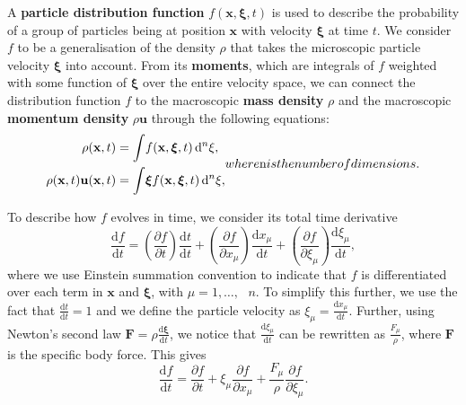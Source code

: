 \documentclass[a4paper, 11pt]{report}
\begin{document}
A \textbf{particle distribution function} $f(\mathbf{x},\bm{\xi},t)$ is used to describe the probability of a group of particles being at position $\mathbf{x}$ with velocity $\bm{\xi}$ at time $t$. We consider $f$ to be a generalisation of the density $\rho$ that takes the microscopic particle velocity $\bm{\xi}$ into account.
\newpage
From its \textbf{moments}, which are integrals of $f$ weighted with some function of $\bm{\xi}$ over the entire velocity space, we can connect the distribution function $f$ to the macroscopic \textbf{mass density} $\rho$ and the macroscopic \textbf{momentum density} $\rho\mathbf{u}$ through the following equations:
\begin{subequations}
\begin{align}
	\rho(\mathbf{x},t) &= \int \! f(\mathbf{x},\bm{\xi},t) \, \mathrm{d}^n\xi, \label{eq:3.1a} \\
	\rho(\mathbf{x},t)\mathbf{u}(\mathbf{x},t) &= \int \! \bm{\xi}f(\mathbf{x},\bm{\xi},t) \, \mathrm{d}^n\xi, \label{eq:3.1b}
\end{align}
where $n$ is the number of dimensions.
\end{subequations} \label{eq:3.1}

To describe how $f$ evolves in time, we consider its total time derivative
\begin{equation}
    \frac{\mathrm{d}f}{\mathrm{d}t} = \left( \frac{\partial f}{\partial t} \right) \frac{\mathrm{d}t}{\mathrm{d}t} + \left( \frac{\partial f}{\partial x_\mu}\right) \frac{\mathrm{d}x_\mu}{\mathrm{d}t} + \left( \frac{\partial f}{\partial \xi_\mu} \right) \frac{\mathrm{d} \xi_\mu}{\mathrm{d} t}, \label{eq:3.2}
\end{equation}
where we use Einstein summation convention to indicate that $f$ is differentiated over each term in $\mathbf{x}$ and $\bm{\xi}$, with $\mu=1,\dots,\text{ }n$. To simplify this further, we use the fact that $\frac{\mathrm{d}t}{\mathrm{d}t} = 1$ and we define the particle velocity as $\xi_\mu=\frac{\mathrm{d}x_\mu}{\mathrm{d}t}$. Further, using Newton's second law $\mathbf{F} = \rho\frac{\mathrm{d} \bm{\xi}}{\mathrm{d} t}$, we notice that $\frac{\mathrm{d} \xi_\mu}{\mathrm{d} t}$ can be rewritten as $\frac{F_\mu}{\rho}$, where $\mathbf{F}$ is the specific body force. This gives
\begin{equation}
    \frac{\mathrm{d}f}{\mathrm{d}t} = \frac{\partial f}{\partial t} + \xi_\mu\frac{\partial f}{\partial x_\mu} + \frac{F_\mu}{\rho} \frac{\partial f}{\partial \xi_\mu}. \label{eq:3.3}
\end{equation}
\end{document}

